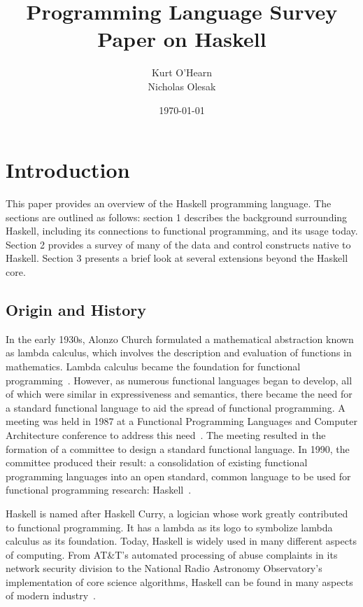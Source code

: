 \documentclass[titlepage,12pt]{article}
\title{Programming Language Survey Paper on Haskell}
\author{
        Kurt O'Hearn\\
        Nicholas Olesak\\
}
\date{\today}
\begin{document}
\maketitle 
\setcounter{tocdepth}{3}
\tableofcontents \newpage

\section{Introduction}
This paper provides an overview of the Haskell programming language.  The sections are outlined as follows:
section 1 describes the background surrounding Haskell, including its connections to functional programming,
and its usage today.  Section 2 provides a survey of many of the data and control constructs native to Haskell.
Section 3 presents a brief look at several extensions beyond the Haskell core.

\subsection{Origin and History}

In the early 1930s, Alonzo Church formulated a mathematical abstraction known as lambda calculus, which involves the description 
and evaluation of functions in mathematics. Lambda calculus became the foundation for functional programming~\cite{haskell-wiki}. 
However, as numerous functional languages began to develop, all of which were similar in expressiveness and semantics, there 
became the need for a standard functional language to aid the spread of functional programming. A meeting was held 
in 1987 at a Functional Programming Languages and Computer Architecture conference to address this need~\cite{hudak-hist}. The meeting 
resulted in the formation of a committee to design a standard functional language. In 1990, the committee produced their result: 
a consolidation of existing functional programming languages into an open standard, common language to be used for 
functional programming research: Haskell~\cite{hudak-con}.

Haskell is named after Haskell Curry, a logician whose work greatly contributed to functional programming. It has a 
lambda as its logo to symbolize lambda calculus as its foundation. Today, Haskell is widely used in many different aspects 
of computing. From AT\&T's automated processing of abuse complaints in its network security division to the National 
Radio Astronomy Observatory’s implementation of core science algorithms, Haskell can be found in many aspects of 
modern industry~\cite{haskell-wiki}. 
\end{document}
